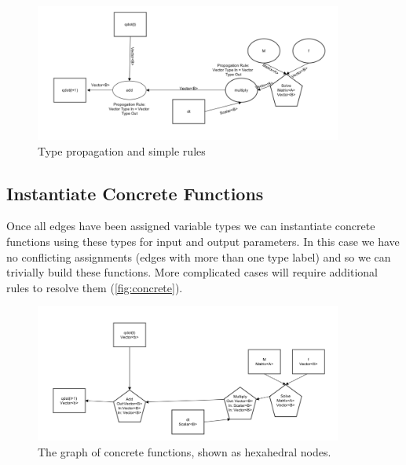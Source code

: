 \documentclass{article}
\begin{document}
\begin{figure}[ht]
\includegraphics[width=0.9\textwidth]{figures/propagateTypes}
\caption{Type propagation and simple rules  }
\label{fig:propagate}
\end{figure}

\subsection{Instantiate Concrete Functions}
Once all edges have been assigned variable types we can instantiate concrete functions using these types for input and output parameters. In this case we have no conflicting assignments  (edges with more than one type label) and so we can trivially build these functions. More complicated cases will require additional rules to resolve them (\autoref{fig:concrete}).

\begin{figure}[ht]
\includegraphics[width=0.9\textwidth]{figures/instantiategraph}
\caption{The graph of concrete functions, shown as hexahedral nodes.  }
\label{fig:concrete}
\end{figure}
\end{document}
